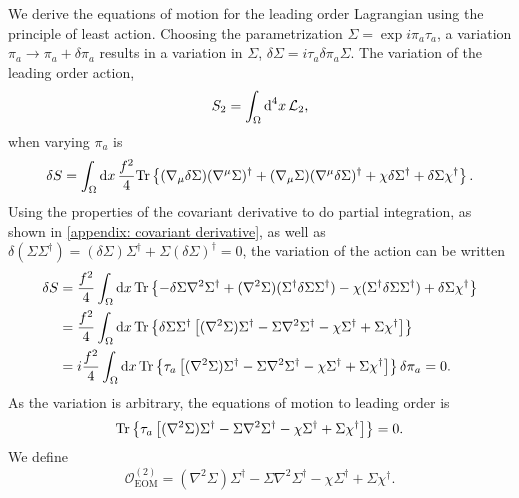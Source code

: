 We derive the equations of motion for the leading order Lagrangian using the principle of least action.
Choosing the parametrization $\Sigma = \exp{i \pi_a \tau_a}$, a variation $\pi_a \rightarrow \pi_a + \delta \pi_a$ results in a variation in $\Sigma$, $\delta \Sigma = i \tau_a \delta \pi_a \Sigma $.
The variation of the leading order action,
\begin{equation}
    S_2 = \int_\Omega \text{d}^4x \, \mathcal{L}_2,
\end{equation}
when varying $\pi_a$ is 
\begin{align*}
    \delta S = \int_\Omega \text{d} x \, \frac{f^2}{4}
    \text{Tr} \left\{ 
        (\nabla_\mu \delta \Sigma) (\nabla^\mu \Sigma)^\dagger
        + (\nabla_\mu \Sigma) (\nabla^\mu \delta \Sigma)^\dagger
        + \chi \delta \Sigma^\dagger + \delta \Sigma \chi^\dagger
     \right\}.
\end{align*}
Using the properties of the covariant derivative to do partial integration, as shown in \autoref{appendix: covariant derivative}, as well as $\delta(\Sigma \Sigma^\dagger) = (\delta\Sigma)\Sigma^\dagger + \Sigma (\delta \Sigma)^\dagger = 0$, the variation of the action can be written
\begin{align*}
    \delta S 
    & = \frac{f^2}{4} \int_\Omega \text{d} x\, 
    \text{Tr} \left\{ 
        - \delta \Sigma \nabla^2 \Sigma^\dagger
        + (\nabla^2 \Sigma) (\Sigma^\dagger \delta \Sigma \Sigma^\dagger)
        - \chi (\Sigma^\dagger \delta \Sigma \Sigma^\dagger)
        + \delta \Sigma \chi^\dagger
     \right\} \\
    & = 
    \frac{f^2}{4} \int_\Omega \text{d} x\, 
    \text{Tr} \left\{ 
        \delta \Sigma \Sigma^\dagger 
        \left[
            (\nabla^2 \Sigma)\Sigma^\dagger
            - \Sigma \nabla^2 \Sigma^\dagger
            - \chi \Sigma^\dagger
            + \Sigma \chi^\dagger
        \right]
         \right\} \\
    & = 
    i \frac{f^2}{4} \int_\Omega \text{d} x\, 
    \text{Tr} \left\{ \tau_a 
    \left[
         (\nabla^2 \Sigma)\Sigma^\dagger
        - \Sigma \nabla^2 \Sigma^\dagger
        - \chi \Sigma^\dagger
        + \Sigma \chi^\dagger
    \right]
     \right\} 
    \delta \pi_a = 0.
\end{align*}
%
As the variation is arbitrary, the equations of motion to leading order is
%
\begin{equation}
    \text{Tr} \left\{ 
        \tau_a 
        \left[
            (\nabla^2 \Sigma)\Sigma^\dagger
            - \Sigma \nabla^2 \Sigma^\dagger
            - \chi \Sigma^\dagger
            + \Sigma \chi^\dagger
        \right]
     \right\} = 0.
\end{equation}
%
We define
%
\begin{equation}
    \mathcal O_\text{EOM}^{(2)}
    = 
    (\nabla^2 \Sigma)\Sigma^\dagger
    - \Sigma \nabla^2 \Sigma^\dagger
    - \chi \Sigma^\dagger
    + \Sigma \chi^\dagger.
\end{equation}


